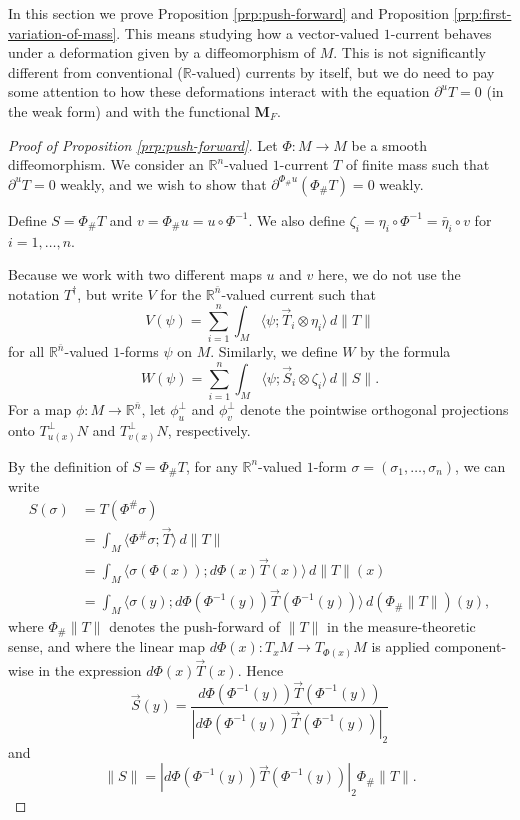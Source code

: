 \documentclass[10pt,a4paper]{amsart}
\newcommand{\R}{\mathbb{R}}
\newcommand{\M}{\mathbf{M}}
\newcommand{\ndim}{{\bar{n}}}
\newcommand{\pairing}[2]{\langle #1; #2 \rangle}
\begin{document}
In this section we prove Proposition \ref{prp:push-forward} and Proposition \ref{prp:first-variation-of-mass}.
This means studying how a vector-valued $1$-current
behaves under a deformation given by a diffeomorphism of $M$. This is not significantly different
from conventional ($\R$-valued) currents by itself, but we do need to pay some attention to how these deformations
interact with the equation $\partial^u T = 0$ (in the weak form) and with the functional $\M_F$.

\begin{proof}[Proof of Proposition \ref{prp:push-forward}]
Let $\Phi \colon M \to M$ be a smooth diffeomorphism.
We consider an $\R^n$-valued $1$-current $T$ of finite mass such that $\partial^u T = 0$ weakly,
and we wish to show that $\partial^{\Phi_\# u} (\Phi_\# T) = 0$ weakly.

Define $S = \Phi_\# T$ and $v = \Phi_\# u = u \circ \Phi^{- 1}$. We also define
$\zeta_i = \eta_i \circ \Phi^{-1} = \bar{\eta}_i \circ v$ for $i = 1, \dotsc, n$.

Because we work with two different maps $u$ and $v$ here, we do not use the notation $T^\dagger$, but write $V$ for the $\R^\ndim$-valued current such that
\[
V(\psi) = \sum_{i = 1}^n \int_M \pairing{\psi}{\vec{T}_i \otimes \eta_i} \, d\|T\|
\]
for all $\R^\ndim$-valued $1$-forms $\psi$ on $M$. Similarly, we define $W$ by
the formula
\[
W(\psi) = \sum_{i = 1}^n \int_M \pairing{\psi}{\vec{S}_i \otimes \zeta_i} \, d\|S\|.
\]
For a map $\phi \colon M \to \R^\ndim$, let $\phi_u^\perp$ and $\phi_v^\perp$ denote the pointwise orthogonal projections onto $T_{u(x)}^\perp N$ and
$T_{v(x)}^\perp N$, respectively.

By the definition of $S = \Phi_\# T$,
for any $\R^n$-valued $1$-form $\sigma = (\sigma_1, \dotsc, \sigma_n)$, we can write
\[
\begin{split}
S(\sigma) & = T(\Phi^\# \sigma) \\
& = \int_M \pairing{\Phi^\# \sigma}{\vec{T}} \, d\|T\| \\
& = \int_M \pairing{\sigma(\Phi(x))}{d\Phi(x) \vec{T}(x)} \, d\|T\|(x) \\
& = \int_M \pairing{\sigma(y)}{d\Phi(\Phi^{-1}(y)) \vec{T}(\Phi^{-1}(y))} \, d(\Phi_\# \|T\|)(y),
\end{split}
\]
where $\Phi_\# \|T\|$ denotes the push-forward of $\|T\|$ in the measure-theoretic sense,
and where the linear map $d\Phi(x) \colon T_x M \to T_{\Phi(x)} M$ is applied component-wise in the expression $d\Phi(x) \vec{T}(x)$.
Hence
\[
\vec{S}(y) = \frac{d\Phi(\Phi^{-1}(y)) \vec{T}(\Phi^{-1}(y))}{|d\Phi(\Phi^{-1}(y)) \vec{T}(\Phi^{-1}(y))|_2}
\]
and
\[
\|S\| = |d\Phi(\Phi^{-1}(y)) \vec{T}(\Phi^{-1}(y))|_2 \Phi_\# \|T\|.
\]


\end{proof}
\end{document}
